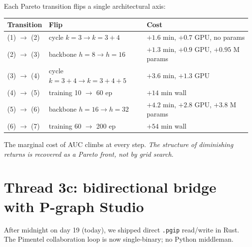 \documentclass[11pt,a4paper]{article}
\theoremstyle{plain}
\theoremstyle{definition}
\begin{document}
Each Pareto transition flips a single architectural axis:

\begin{center}\footnotesize
\begin{tabular}{lll}
\toprule
Transition & Flip & Cost \\
\midrule
(1) $\to$ (2) & cycle $k{=}3 \to k{=}3{+}4$         & $+1.6$ min, $+0.7$ GPU, no params \\
(2) $\to$ (3) & backbone $h{=}8 \to h{=}16$         & $+1.3$ min, $+0.9$ GPU, $+0.95$ M params \\
(3) $\to$ (4) & cycle $k{=}3{+}4 \to k{=}3{+}4{+}5$ & $+3.6$ min, $+1.3$ GPU \\
(4) $\to$ (5) & training 10 $\to$ 60 ep              & $+14$ min wall \\
(5) $\to$ (6) & backbone $h{=}16 \to h{=}32$        & $+4.2$ min, $+2.8$ GPU, $+3.8$ M params \\
(6) $\to$ (7) & training 60 $\to$ 200 ep             & $+54$ min wall \\
\bottomrule
\end{tabular}
\end{center}

The marginal cost of AUC climbs at every step. \emph{The structure
of diminishing returns is recovered as a Pareto front, not by grid
search}.

\section{Thread 3c: bidirectional bridge with P-graph Studio}

After midnight on day 19 (today), we shipped direct \texttt{.pgip}
read/write in Rust. The Pimentel collaboration loop is now
single-binary; no Python middleman.
\end{document}

